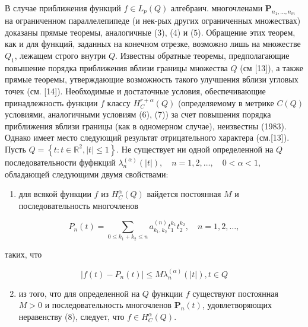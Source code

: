 \documentclass[10pt]{article}
\begin{document}
В случае приближения функций $f \in L_{p}(Q)$ алгебраич. многочленами $\boldsymbol{P}_{n_{1}, \ldots, n_{m}}$ на ограниченном параллелепипеде (и нек-рых других ограниченных множествах) доказаны прямые теоремы, аналогичные (3), (4) и (5). Обращение этих теорем, как и для функций, заданных на конечном отрезке, возможно лишь на множестве $Q_{1}$, лежащем строго внутри $Q$. Известны обратные теоремы, предполагающие повышение порядка приближения вблизи границы множества $Q$ (см [13]), а также прямые теоремы, утверждающие возможность такого улучшения вблизи угловых точек (см. [14]). Необходимые и достаточные условия, обеспечивающие принадлежность функции $f$ классу $H_{C}^{r+\alpha}(Q)$ (определяемому в метрике $C(Q)$ условиями, аналогичными условиям (6), (7)) за счет повышения порядка приближения вблизи границы (как в одномерном случае), неизвестны (1983). Однако имеет место следующий результат отрицательного характера (см.[13]). Пусть $Q=\left\{t: t \in \mathbb{R}^{2},|t| \leqslant 1\right\}$. Не существует ни одной определенной на $Q$ последовательности фуфнкций $\lambda_{n}^{(\alpha)}(|t|), \quad n=1,2, \ldots, \quad 0<\alpha<1, \quad$ обладающей следующими двумя свойствами:



\begin{enumerate}

  \item для всякой функции $f$ из $H_{C}^{\alpha}(Q)$ вайдется постоянная $M$ и последовательность многочленов

\end{enumerate}



\[

P_{n}(t)=\sum_{0 \leqslant k_{1}+k_{2} \leqslant n} a_{k_{1}, k_{2}}^{(n)} t_{1}^{k_{1}} t_{2}^{k_{2}}, \quad n=1,2, \ldots,

\]



таких, что



\[

\left|f(t)-P_{n}(t)\right| \leqslant M \lambda_{n}^{(\alpha)}(|t|), t \in Q

\]



\begin{enumerate}

  \setcounter{enumi}{1}

  \item из того, что для определенной на $Q$ функции $f$ существуют постоянная $M>0$ и последовательность многочленов $\boldsymbol{P}_{n}(t)$, удовлетворяющих неравенству (8), следует, что $f \in H_{C}^{\alpha}(Q)$.

\end{enumerate}
\end{document}
